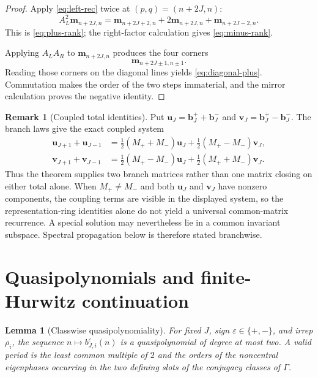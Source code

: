 \documentclass[11pt]{article}
\newtheorem{lemma}[theorem]{Lemma}
\theoremstyle{definition}
\newtheorem{remark}[theorem]{Remark}
\begin{document}
\begin{proof}
Apply \eqref{eq:left-rec} twice at
$(p,q)=(n+2J,n)$:
\[
 A_L^2\boldsymbol m_{n+2J,n}
 =
 \boldsymbol m_{n+2J+2,n}
 +2\boldsymbol m_{n+2J,n}
 +\boldsymbol m_{n+2J-2,n}.
\]
This is \eqref{eq:plus-rank}; the right-factor calculation gives
\eqref{eq:minus-rank}.

Applying $A_LA_R$ to $\boldsymbol m_{n+2J,n}$ produces the four
corners
\[
 \boldsymbol m_{n+2J\pm1,n\pm1}.
\]
Reading those corners on the diagonal lines yields
\eqref{eq:diagonal-plus}.  Commutation makes the order of the two
steps immaterial, and the mirror calculation proves the negative
identity.
\end{proof}

\begin{remark}[Coupled total identities]
\label{rem:no-common}
Put $\boldsymbol u_J=\boldsymbol b_J^++\boldsymbol b_J^-$ and
$\boldsymbol v_J=\boldsymbol b_J^+-\boldsymbol b_J^-$.  The branch
laws give the exact coupled system
\begin{align*}
 \boldsymbol u_{J+1}+\boldsymbol u_{J-1}
 &=
 \tfrac12(M_++M_-)\boldsymbol u_J
 +\tfrac12(M_+-M_-)\boldsymbol v_J,\\
 \boldsymbol v_{J+1}+\boldsymbol v_{J-1}
 &=
 \tfrac12(M_+-M_-)\boldsymbol u_J
 +\tfrac12(M_++M_-)\boldsymbol v_J.
\end{align*}
Thus the theorem supplies two branch matrices rather than one matrix
closing on either total alone.  When $M_+\ne M_-$ and both
$\boldsymbol u_J$ and $\boldsymbol v_J$ have nonzero components, the
coupling terms are visible in the displayed system, so the
representation-ring identities alone do not yield a universal
common-matrix recurrence.  A special solution may nevertheless lie in a
common invariant subspace.  Spectral propagation below is therefore stated
branchwise.
\end{remark}

\section{Quasipolynomials and finite-Hurwitz continuation}

\begin{lemma}[Classwise quasipolynomiality]
\label{lem:quasipolynomial}
For fixed $J$, sign $\varepsilon\in\{+,-\}$, and irrep $\rho_i$, the
sequence $n\mapsto b_{J,i}^{\varepsilon}(n)$ is a quasipolynomial of
degree at most two.  A valid period is the least common multiple of
$2$ and the orders of the noncentral eigenphases occurring in the two
defining slots of the conjugacy classes of $\Gamma$.
\end{lemma}
\end{document}
